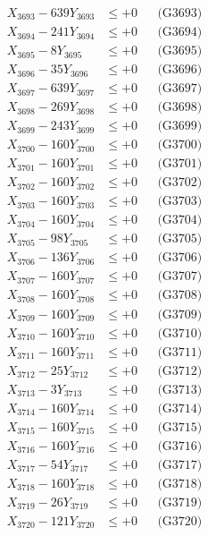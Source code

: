 \documentclass[a4paper,10pt]{article}
\begin{document}
{\begin{align}
X_{3693} - 639Y_{3693} &\leq +0 && \text{(G3693)} \\
X_{3694} - 241Y_{3694} &\leq +0 && \text{(G3694)} \\
X_{3695} - 8Y_{3695} &\leq +0 && \text{(G3695)} \\
X_{3696} - 35Y_{3696} &\leq +0 && \text{(G3696)} \\
X_{3697} - 639Y_{3697} &\leq +0 && \text{(G3697)} \\
X_{3698} - 269Y_{3698} &\leq +0 && \text{(G3698)} \\
X_{3699} - 243Y_{3699} &\leq +0 && \text{(G3699)} \\
X_{3700} - 160Y_{3700} &\leq +0 && \text{(G3700)} \\
\allowbreak
X_{3701} - 160Y_{3701} &\leq +0 && \text{(G3701)} \\
X_{3702} - 160Y_{3702} &\leq +0 && \text{(G3702)} \\
X_{3703} - 160Y_{3703} &\leq +0 && \text{(G3703)} \\
X_{3704} - 160Y_{3704} &\leq +0 && \text{(G3704)} \\
X_{3705} - 98Y_{3705} &\leq +0 && \text{(G3705)} \\
X_{3706} - 136Y_{3706} &\leq +0 && \text{(G3706)} \\
X_{3707} - 160Y_{3707} &\leq +0 && \text{(G3707)} \\
X_{3708} - 160Y_{3708} &\leq +0 && \text{(G3708)} \\
X_{3709} - 160Y_{3709} &\leq +0 && \text{(G3709)} \\
X_{3710} - 160Y_{3710} &\leq +0 && \text{(G3710)} \\
\allowbreak
X_{3711} - 160Y_{3711} &\leq +0 && \text{(G3711)} \\
X_{3712} - 25Y_{3712} &\leq +0 && \text{(G3712)} \\
X_{3713} - 3Y_{3713} &\leq +0 && \text{(G3713)} \\
X_{3714} - 160Y_{3714} &\leq +0 && \text{(G3714)} \\
X_{3715} - 160Y_{3715} &\leq +0 && \text{(G3715)} \\
X_{3716} - 160Y_{3716} &\leq +0 && \text{(G3716)} \\
X_{3717} - 54Y_{3717} &\leq +0 && \text{(G3717)} \\
X_{3718} - 160Y_{3718} &\leq +0 && \text{(G3718)} \\
X_{3719} - 26Y_{3719} &\leq +0 && \text{(G3719)} \\
X_{3720} - 121Y_{3720} &\leq +0 && \text{(G3720)} \\

\end{align}}
\end{document}
